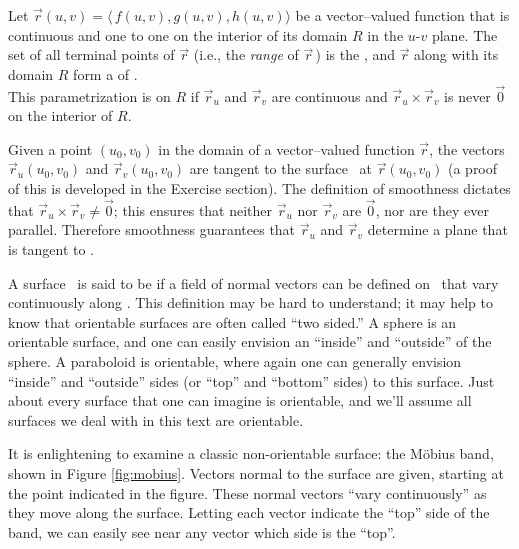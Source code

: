 {Let $\vec r(u,v) = \langle\, f(u,v),g(u,v),h(u,v)\rangle$ be a vector--valued function
that is continuous and one to one on the interior of its domain $R$ in the $u$-$v$ plane. The set of all terminal points of $\vec r$ (i.e., the \emph{range} of $\vec r$\,) is the  \surfaceS, and $\vec r$ along with its domain $R$ form a  of \surfaceS.\\

This parametrization is  on $R$ if $\vec r_u$ and $\vec r_v$ are continuous and $\vec r_u\times \vec r_v$ is never $\vec 0$ on the interior of $R$.
}


Given a point $(u_0,v_0)$ in the domain of a vector--valued function $\vec r$, the vectors $\vec r_u(u_0,v_0)$ and $\vec r_v(u_0,v_0)$ are tangent to the surface \surfaceS\ at $\vec r(u_0,v_0)$ (a proof of this is developed in the Exercise section). The definition of smoothness dictates that $\vec r_u\times \vec r_v \neq \vec 0$; this ensures that neither $\vec r_u$ nor $\vec r_v$ are $\vec 0$, nor are they ever parallel. Therefore smoothness guarantees that $\vec r_u$ and $\vec r_v$ determine a plane that is tangent to \surfaceS.

A surface \surfaceS\ is said to be  if a field of normal vectors can be defined on \surfaceS\ that vary continuously along \surfaceS. This definition may be hard to understand; it may help to know that orientable surfaces are often called ``two sided.'' A sphere is an orientable surface, and one can easily envision an ``inside'' and ``outside'' of the sphere. A paraboloid is orientable, where again one can generally envision  ``inside'' and ``outside'' sides (or ``top'' and ``bottom'' sides) to this surface. Just about every surface that one can imagine is orientable, and we'll assume all surfaces we deal with in this text are orientable.

It is enlightening to examine a classic non-orientable surface: the M\"obius band, shown in Figure \ref{fig:mobius}. Vectors normal to the surface are given, starting at the point indicated in the figure. These normal vectors ``vary continuously'' as they move along the surface. Letting each vector indicate the ``top'' side of the band, we can easily see near any vector which side is the ``top''.

